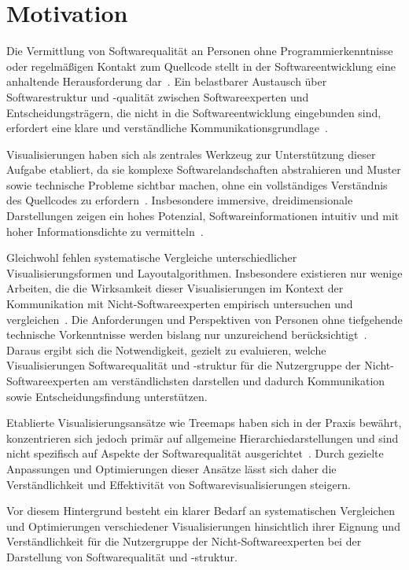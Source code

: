\chapter{Motivation} \label{sec:Motivation}

Die Vermittlung von Softwarequalität an Personen ohne Programmierkenntnisse oder regelmäßigen Kontakt zum Quellcode stellt in der Softwareentwicklung eine anhaltende Herausforderung dar~\cite{slrSoftwareVisualization}. Ein belastbarer Austausch über Softwarestruktur und -qualität zwischen Softwareexperten und Entscheidungsträgern, die nicht in die Softwareentwicklung eingebunden sind, erfordert eine klare und verständliche Kommunikationsgrundlage~\cite{komu_vis}.

Visualisierungen haben sich als zentrales Werkzeug zur Unterstützung dieser Aufgabe etabliert, da sie komplexe Softwarelandschaften abstrahieren und Muster sowie technische Probleme sichtbar machen, ohne ein vollständiges Verständnis des Quellcodes zu erfordern~\cite{overview3D,codeCity1,3dsoftwareMarcus}. Insbesondere immersive, dreidimensionale Darstellungen zeigen ein hohes Potenzial, Softwareinformationen intuitiv und mit hoher Informationsdichte zu vermitteln~\cite{overview3D, metricsBased3DVisualization, solarSystem}.

Gleichwohl fehlen systematische Vergleiche unterschiedlicher Visualisierungsformen und Layoutalgorithmen. Insbesondere existieren nur wenige Arbeiten, die die Wirksamkeit dieser Visualisierungen im Kontext der Kommunikation mit Nicht-Softwareexperten empirisch untersuchen und vergleichen~\cite{scheibel2020survey}. Die Anforderungen und Perspektiven von Personen ohne tiefgehende technische Vorkenntnisse werden bislang nur unzureichend berücksichtigt~\cite{scheibel2020survey, overview3D}. Daraus ergibt sich die Notwendigkeit, gezielt zu evaluieren, welche Visualisierungen Softwarequalität und -struktur für die Nutzergruppe der Nicht-Softwareexperten am verständlichsten darstellen und dadurch Kommunikation sowie Entscheidungsfindung unterstützen.


Etablierte Visualisierungsansätze wie Treemaps haben sich in der Praxis bewährt, konzentrieren sich jedoch primär auf allgemeine Hierarchiedarstellungen und sind nicht spezifisch auf Aspekte der Softwarequalität ausgerichtet~\cite{johnson1991tree}. Durch gezielte Anpassungen und Optimierungen dieser Ansätze lässt sich daher die Verständlichkeit und Effektivität von Softwarevisualisierungen steigern.

Vor diesem Hintergrund besteht ein klarer Bedarf an systematischen Vergleichen und Optimierungen verschiedener Visualisierungen hinsichtlich ihrer Eignung und Verständlichkeit für die Nutzergruppe der Nicht-Softwareexperten bei der Darstellung von Softwarequalität und -struktur.